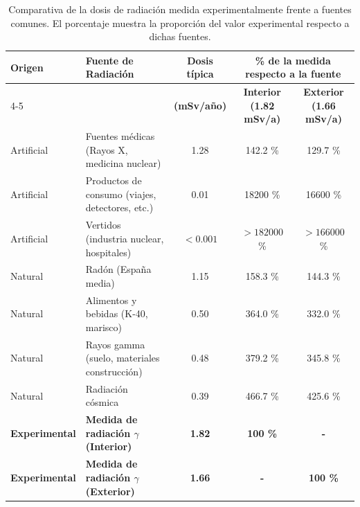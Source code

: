 \documentclass[11pt]{article}
\begin{document}
\begin{table}[h]
\centering
\renewcommand{\arraystretch}{1.2}
\setlength{\tabcolsep}{4pt}
\begin{tabular}{|l|l|c|c|c|}
\hline
\multirow{2}{*}{\textbf{Origen}} & \multirow{2}{*}{\textbf{Fuente de Radiación}} & \textbf{Dosis típica} & \multicolumn{2}{c|}{\textbf{\% de la medida respecto a la fuente}} \\
\cline{4-5}
& & \textbf{(mSv/año)} & \textbf{Interior (1.82 mSv/a)} & \textbf{Exterior (1.66 mSv/a)} \\
\hline
Artificial & Fuentes médicas (Rayos X, medicina nuclear) & 1.28 & 142.2 \% & 129.7 \% \\
Artificial & Productos de consumo (viajes, detectores, etc.) & 0.01 & 18200 \% & 16600 \% \\
Artificial & Vertidos (industria nuclear, hospitales) & $< 0.001$ & $> 182000$ \% & $> 166000$ \% \\
Natural & Radón (España media) & 1.15 & 158.3 \% & 144.3 \% \\
Natural & Alimentos y bebidas (K-40, marisco) & 0.50 & 364.0 \% & 332.0 \% \\
Natural & Rayos gamma (suelo, materiales construcción) & 0.48 & 379.2 \% & 345.8 \% \\
Natural & Radiación cósmica & 0.39 & 466.7 \% & 425.6 \% \\
\hline
\hline
\textbf{Experimental} & \textbf{Medida de radiación $\gamma$ (Interior)} & \textbf{1.82} & \textbf{100 \%} & \textbf{-} \\
\textbf{Experimental} & \textbf{Medida de radiación $\gamma$ (Exterior)} & \textbf{1.66} & \textbf{-} & \textbf{100 \%} \\
\hline
\end{tabular}
\caption{\footnotesize Comparativa de la dosis de radiación medida experimentalmente frente a fuentes comunes. El porcentaje muestra la proporción del valor experimental respecto a dichas fuentes.}
\label{tab:comparativa_gamma}
\end{table}
\end{document}
